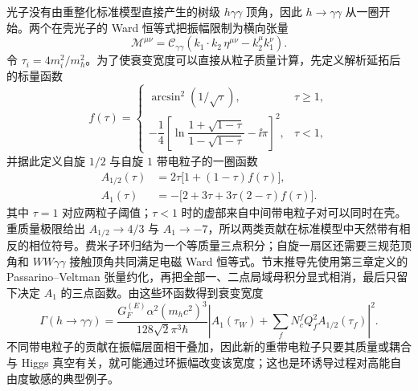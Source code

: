光子没有由重整化标准模型直接产生的树级 $h\gamma\gamma$ 顶角，因此 $h\to\gamma\gamma$ 从一圈开始。两个在壳光子的 Ward 恒等式把振幅限制为横向张量
\begin{equation}
\mathcal M^{\mu\nu}
=\mathcal C_{\gamma\gamma}
\left(k_1\cdot k_2\,\eta^{\mu\nu}-k_2^\mu k_1^\nu\right).
\label{eq:hggamma-transverse-tensor-dp11}
\end{equation}
令 $\tau_i=4m_i^2/m_h^2$。为了使衰变宽度可以直接从粒子质量计算，先定义解析延拓后的标量函数
\begin{equation*}
 f(\tau)=
 \begin{cases}
 \arcsin^2(1/\sqrt\tau),&\tau\ge1,\\[4pt]
 -\dfrac14\left[
 \ln\dfrac{1+\sqrt{1-\tau}}{1-\sqrt{1-\tau}}-\ii\pi
 \right]^2,&\tau<1,
 \end{cases}
\end{equation*}
并据此定义自旋 $1/2$ 与自旋 $1$ 带电粒子的一圈函数
\begin{equation}
\boxed{
\begin{aligned}
 A_{1/2}(\tau)&=2\tau\bigl[1+(1-\tau)f(\tau)\bigr],\\
 A_1(\tau)&=-\bigl[2+3\tau+3\tau(2-\tau)f(\tau)\bigr].
\end{aligned}}
\label{eq:sm-hgamma-loop-functions-dp41}
\end{equation}
其中 $\tau=1$ 对应两粒子阈值；$\tau<1$ 时的虚部来自中间带电粒子对可以同时在壳。重质量极限给出 $A_{1/2}\to4/3$ 与 $A_1\to-7$，所以两类贡献在标准模型中天然带有相反的相位符号。费米子环归结为一个等质量三点积分；自旋一扇区还需要三规范顶角和 $WW\gamma\gamma$ 接触顶角共同满足电磁 Ward 恒等式。节末推导先使用第三章定义的 Passarino--Veltman 张量约化，再把全部一、二点局域母积分显式相消，最后只留下决定 $A_1$ 的三点函数。由这些环函数得到衰变宽度
\begin{equation}
\boxed{
\Gamma(h\to\gamma\gamma)
=\frac{G_F^{(E)}\alpha^2(m_hc^2)^3}
{128\sqrt2\pi^3\hbar}
\left|
A_1(\tau_W)
+\sum_fN_c^fQ_f^2A_{1/2}(\tau_f)
\right|^2.}
\label{eq:h-to-gammagamma-dp11}
\end{equation}
不同带电粒子的贡献在振幅层面相干叠加，因此新的重带电粒子只要其质量或耦合与 Higgs 真空有关，就可能通过环振幅改变该宽度；这也是环诱导过程对高能自由度敏感的典型例子。

